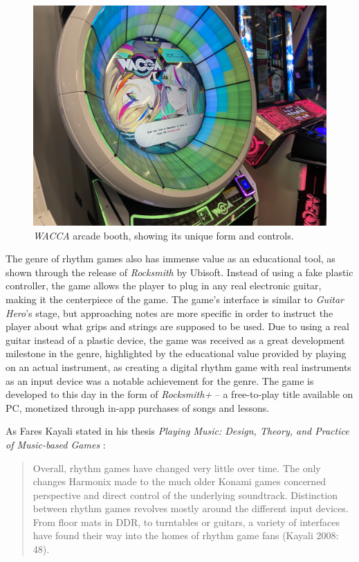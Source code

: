 \begin{figure}[h]
    \centering\includegraphics[scale=0.01]{obrazki/waccaarcade.jpg}
    \caption{\textit{WACCA} arcade booth, showing its unique form and controls. \cite{waccaarcade}}
    \label{fig:wacca_arcade}
\end{figure}

The genre of rhythm games also has immense value as an educational tool, as shown through the release of \textit{Rocksmith} by Ubisoft. Instead of using a fake plastic controller, the game allows the player to plug in any real electronic guitar, making it the centerpiece of the game. The game’s interface is similar to \textit{Guitar Hero}’s stage, but approaching notes are more specific in order to instruct the player about what grips and strings are supposed to be used. Due to using a real guitar instead of a plastic device, the game was received as a great development milestone in the genre, highlighted by the educational value provided by playing on an actual instrument, as creating a digital rhythm game with real instruments as an input device was a notable achievement for the genre. The game is developed to this day in the form of \textit{Rocksmith+} -- a free-to-play title available on PC, monetized through in-app purchases of songs and lessons.

As Fares Kayali stated in his thesis \textit{Playing Music: Design, Theory, and Practice of Music-based Games} \cite{faresplayingmusic}: 
\begin{quote}
    Overall, rhythm games have changed very little over time. The only changes Harmonix made to the much older Konami games concerned perspective and direct control of the underlying soundtrack. Distinction between rhythm games revolves mostly around the different input devices. From floor mats in DDR, to turntables or guitars, a variety of interfaces have found their way into the homes of rhythm game fans (Kayali 2008: 48).
\end{quote}


